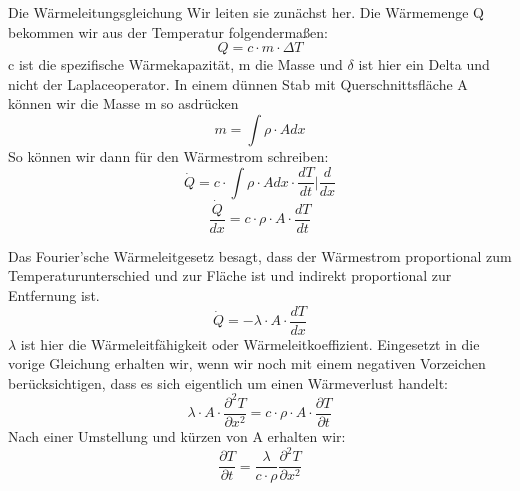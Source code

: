 \documentclass[
	11pt, %
]{beamer}
\begin{document}
\begin{frame}
	\begin{exampleblock}{Die W\"armeleitungsgleichung}
		Wir leiten sie zun\"achst her. Die W\"armemenge Q bekommen wir aus der Temperatur folgenderma{\ss}en:
		\begin{equation}
			Q =  c\cdot m\cdot \Delta T
		\end{equation}
		c ist die spezifische W\"armekapazit\"at, m die Masse und $\delta$ ist hier ein Delta und nicht der Laplaceoperator. In einem d\"unnen Stab mit Querschnittsfl\"ache A k\"onnen wir die Masse m so asdr\"ucken
		\begin{equation}
			m = \int \rho\cdot A  dx
		\end{equation}
		So k\"onnen wir dann f\"ur den W\"armestrom schreiben:
		\begin{equation}
			\dot{Q} = c\cdot\int \rho\cdot A  dx\cdot  \frac{dT}{dt} \big| \frac{d}{dx}
		\end{equation}
		\begin{equation}
			\frac{\dot{Q}}{dx} = c\cdot\rho\cdot A  \cdot \frac{dT}{dt}
		\end{equation}
	\end{exampleblock}
\end{frame}
\begin{frame}
	\begin{exampleblock}{}
		Das Fourier'sche W\"armeleitgesetz besagt, dass der W\"armestrom proportional zum Temperaturunterschied und zur Fl\"ache ist und indirekt proportional zur Entfernung ist.
		\begin{equation}
			\dot{Q} = -\lambda\cdot A\cdot\frac{dT}{dx}
		\end{equation}
		$\lambda$ ist hier die W\"armeleitf\"ahigkeit oder W\"armeleitkoeffizient.
	Eingesetzt in die vorige Gleichung erhalten wir, wenn wir noch mit einem negativen Vorzeichen ber\"ucksichtigen, dass es sich eigentlich um einen W\"armeverlust handelt:
	\begin{equation}
	\lambda\cdot A\cdot\frac{\partial^2T}{\partial x^2}=c\cdot\rho\cdot A  \cdot \frac{\partial T}{\partial t}
	\end{equation}
	Nach einer Umstellung und k\"urzen von A erhalten wir:	
		\begin{equation}
			\frac{\partial T}{\partial t}=\frac{\lambda}{c\cdot \rho}\frac{\partial ^2T}{\partial x^2}
		\end{equation}
	\end{exampleblock}
\end{frame}
\end{document}
